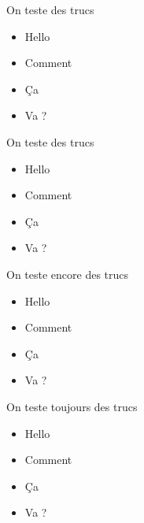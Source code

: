 \label{complements}

\begin{frame}{On teste des trucs}
  \begin{itemize}
    \item<1->Hello
    \item<2->Comment
    \item<3->Ça
    \item<4->Va ?
  \end{itemize}
\end{frame}
\begin{frame}{On teste des trucs}
  \begin{itemize}
    \item<1->Hello
    \item<2->Comment
    \item<3->Ça
    \item<4->Va ?
  \end{itemize}
\end{frame}

\begin{frame}{On teste encore des trucs}
  \begin{itemize}
    \item<1->Hello
    \item<2->Comment
    \item<3->Ça
    \item<4->Va ?
  \end{itemize}
\end{frame}

\begin{frame}{On teste toujours des trucs}
  \begin{itemize}
    \item<1->Hello
    \item<2->Comment
    \item<3->Ça
    \item<4->Va ?
  \end{itemize}
\end{frame}
